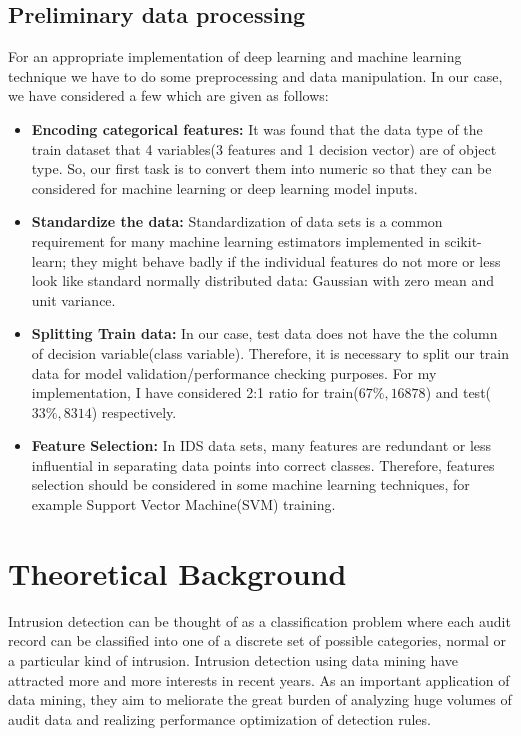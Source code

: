 \documentclass{llncs}
\begin{document}
\subsection{Preliminary data processing}\label{1}
For an appropriate implementation of deep learning and machine learning technique we have to do some preprocessing and data manipulation. In our case, we have considered a few which are given as follows:
\begin{itemize}
\item \textbf{Encoding categorical features:}
It was found that the data type of the train dataset that 4 variables(3 features and 1 decision vector) are of object type. So, our first task is to convert them into numeric so that they can be considered for machine learning or deep learning model inputs.
\item \textbf{Standardize the data:} Standardization of data sets is a common requirement for many machine learning estimators implemented in scikit-learn; they might behave badly if the individual features do not more or less look like standard normally distributed data: Gaussian with zero mean and unit variance.
\item \textbf{Splitting Train data:}
In our case, test data does not have the the column of decision variable(class variable). Therefore, it is necessary to split our train data for model validation/performance checking purposes. For my implementation, I have considered 2:1 ratio for train($67 \% , 16878$) and test($33 \%, 8314$) respectively. 
\item \textbf{Feature Selection:}
In IDS data sets, many features are redundant or less influential in separating data points into correct classes. Therefore, features selection should be considered in some machine learning techniques, for example Support Vector Machine(SVM) training.
\end{itemize}
\section{Theoretical Background}
Intrusion detection can be thought of as a classification problem where each audit record can be classified into one of a discrete set of possible categories, normal or a particular kind of intrusion. Intrusion detection using data mining have attracted more and more interests in recent years. As an important application of data mining, they aim to meliorate the great burden of analyzing huge volumes of audit data and realizing performance optimization of detection rules. 
\end{document}
